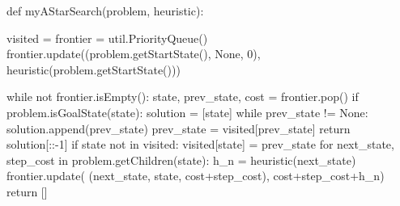 \documentclass{ctexart}
\begin{document}
\begin{python}
def myAStarSearch(problem, heuristic):

    visited = {}
    frontier = util.PriorityQueue()
    frontier.update((problem.getStartState(), None, 0),
                    heuristic(problem.getStartState()))

    while not frontier.isEmpty():
        state, prev_state, cost = frontier.pop()
        if problem.isGoalState(state):
            solution = [state]
            while prev_state != None:
                solution.append(prev_state)
                prev_state = visited[prev_state]
            return solution[::-1]
        if state not in visited:
            visited[state] = prev_state
            for next_state, step_cost in problem.getChildren(state):
                h_n = heuristic(next_state)
                frontier.update(
                    (next_state, state, cost+step_cost), cost+step_cost+h_n)
    return []
\end{python}
\end{document}
